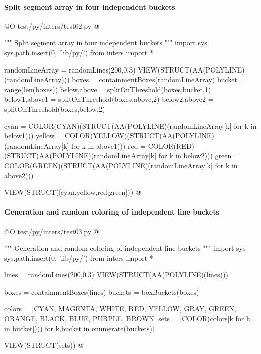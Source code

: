 \documentclass[11pt,oneside]{article}    %
\begin{document}
\paragraph{Split segment array in four independent buckets}
@O test/py/inters/test02.py
@{""" Split segment array in four independent buckets """
import sys
sys.path.insert(0, 'lib/py/')
from inters import *

randomLineArray = randomLines(200,0.3)
VIEW(STRUCT(AA(POLYLINE)(randomLineArray)))
boxes = containmentBoxes(randomLineArray)
bucket = range(len(boxes))
below,above = splitOnThreshold(boxes,bucket,1)
below1,above1 = splitOnThreshold(boxes,above,2)
below2,above2 = splitOnThreshold(boxes,below,2)

cyan = COLOR(CYAN)(STRUCT(AA(POLYLINE)(randomLineArray[k] for k in below1)))
yellow = COLOR(YELLOW)(STRUCT(AA(POLYLINE)(randomLineArray[k] for k in above1)))
red = COLOR(RED)(STRUCT(AA(POLYLINE)(randomLineArray[k] for k in below2)))
green = COLOR(GREEN)(STRUCT(AA(POLYLINE)(randomLineArray[k] for k in above2)))

VIEW(STRUCT([cyan,yellow,red,green]))
@}



\paragraph{Generation and random coloring of independent line buckets}
@O test/py/inters/test03.py
@{""" Generation and random coloring of independent line buckets """
import sys
sys.path.insert(0, 'lib/py/')
from inters import *

lines = randomLines(200,0.3)
VIEW(STRUCT(AA(POLYLINE)(lines)))

boxes = containmentBoxes(lines)
buckets = boxBuckets(boxes)

colors = [CYAN, MAGENTA, WHITE, RED, YELLOW, GRAY, GREEN, ORANGE, BLACK, BLUE, PURPLE, BROWN]
sets = [COLOR(colors[k%
            for h in bucket]))) for k,bucket in enumerate(buckets)]

VIEW(STRUCT(sets))
@}
\end{document}
